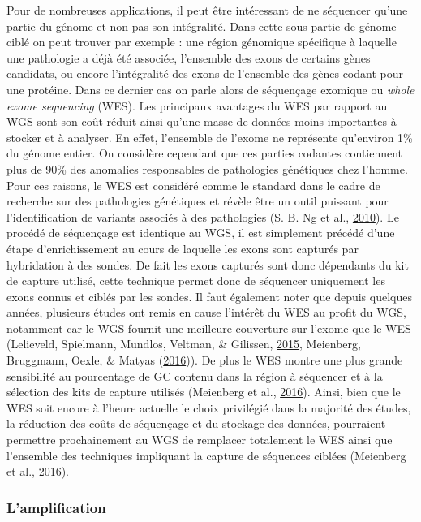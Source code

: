 \documentclass[12pt,twoside]{reedthesis}
\theoremstyle{definition}
\theoremstyle{definition}
\theoremstyle{remark}
\begin{document}
  Pour de nombreuses applications, il peut être intéressant de ne
  séquencer qu'une partie du génome et non pas son intégralité. Dans cette
  sous partie de génome ciblé on peut trouver par exemple : une région
  génomique spécifique à laquelle une pathologie a déjà été associée,
  l'ensemble des exons de certains gènes candidats, ou encore
  l'intégralité des exons de l'ensemble des gènes codant pour une
  protéine. Dans ce dernier cas on parle alors de séquençage exomique ou
  \emph{whole exome sequencing} (WES). Les principaux avantages du WES par
  rapport au WGS sont son coût réduit ainsi qu'une masse de données moins
  importantes à stocker et à analyser. En effet, l'ensemble de l'exome ne
  représente qu'environ 1\% du génome entier. On considère cependant que
  ces parties codantes contiennent plus de 90\% des anomalies responsables
  de pathologies génétiques chez l'homme. Pour ces raisons, le WES est
  considéré comme le standard dans le cadre de recherche sur des
  pathologies génétiques et révèle être un outil puissant pour
  l'identification de variants associés à des pathologies (S. B. Ng et
  al., \protect\hyperlink{ref-Ng2010}{2010}). Le procédé de séquençage est
  identique au WGS, il est simplement précédé d'une étape d'enrichissement
  au cours de laquelle les exons sont capturés par hybridation à des
  sondes. De fait les exons capturés sont donc dépendants du kit de
  capture utilisé, cette technique permet donc de séquencer uniquement les
  exons connus et ciblés par les sondes. Il faut également noter que
  depuis quelques années, plusieurs études ont remis en cause l'intérêt du
  WES au profit du WGS, notamment car le WGS fournit une meilleure
  couverture sur l'exome que le WES (Lelieveld, Spielmann, Mundlos,
  Veltman, \& Gilissen, \protect\hyperlink{ref-Lelieveld2015}{2015},
  Meienberg, Bruggmann, Oexle, \& Matyas
  (\protect\hyperlink{ref-Meienberg2016}{2016})). De plus le WES montre
  une plus grande sensibilité au pourcentage de GC contenu dans la région
  à séquencer et à la sélection des kits de capture utilisés (Meienberg et
  al., \protect\hyperlink{ref-Meienberg2016}{2016}). Ainsi, bien que le
  WES soit encore à l'heure actuelle le choix privilégié dans la majorité
  des études, la réduction des coûts de séquençage et du stockage des
  données, pourraient permettre prochainement au WGS de remplacer
  totalement le WES ainsi que l'ensemble des techniques impliquant la
  capture de séquences ciblées (Meienberg et al.,
  \protect\hyperlink{ref-Meienberg2016}{2016}).
  
  \subsubsection{L'amplification}\label{lamplification}
  
\end{document}
